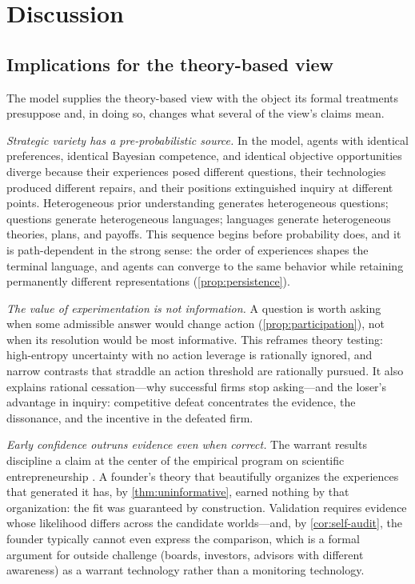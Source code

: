 \section{Discussion}
\label{sec:discussion}

\subsection{Implications for the theory-based view}

The model supplies the theory-based view with the object its formal
treatments presuppose and, in doing so, changes what several of the view's
claims mean.

\emph{Strategic variety has a pre-probabilistic source.}  In the model,
agents with identical preferences, identical Bayesian competence, and
identical objective opportunities diverge because their experiences posed
different questions, their technologies produced different repairs, and
their positions extinguished inquiry at different points.  Heterogeneous
prior understanding generates heterogeneous questions; questions generate
heterogeneous languages; languages generate heterogeneous theories, plans,
and payoffs.  This sequence begins before probability does, and it is
path-dependent in the strong sense: the order of experiences shapes the
terminal language, and agents can converge to the same behavior while
retaining permanently different representations
(\cref{prop:persistence}).

\emph{The value of experimentation is not information.}  A question is
worth asking when some admissible answer would change action
(\cref{prop:participation}), not when its resolution would be most
informative.  This reframes theory testing: high-entropy uncertainty with no
action leverage is rationally ignored, and narrow contrasts that straddle an
action threshold are rationally pursued.  It also explains rational
cessation---why successful firms stop asking---and the loser's advantage in
inquiry: competitive defeat concentrates the evidence, the dissonance, and
the incentive in the defeated firm.

\emph{Early confidence outruns evidence even when correct.}  The warrant
results discipline a claim at the center of the empirical program on
scientific entrepreneurship \citep{CamuffoEtAl2020,ZellwegerZenger2023}.  A
founder's theory that beautifully organizes the experiences that generated
it has, by \cref{thm:uninformative}, earned nothing by that organization:
the fit was guaranteed by construction.  Validation requires evidence whose
likelihood differs across the candidate worlds---and, by
\cref{cor:self-audit}, the founder typically cannot even express the
comparison, which is a formal argument for outside challenge (boards,
investors, advisors with different awareness) as a warrant technology rather
than a monitoring technology.


